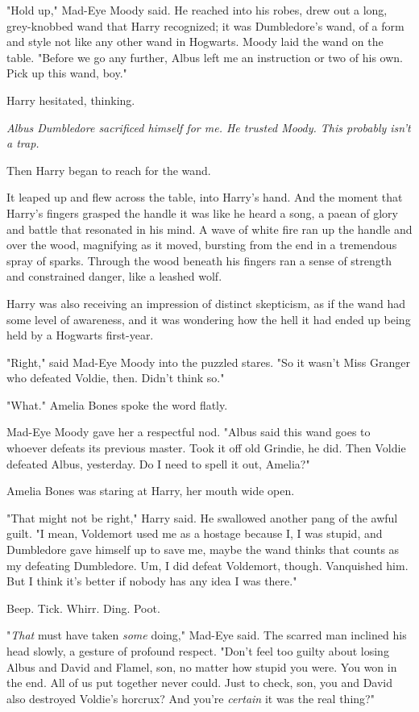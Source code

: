 "Hold up," Mad-Eye Moody said. He reached into his robes, drew out a long,
grey-knobbed wand that Harry recognized; it was Dumbledore's wand, of a form
and style not like any other wand in Hogwarts. Moody laid the wand on the
table. "Before we go any further, Albus left me an instruction or two of his
own. Pick up this wand, boy."

Harry hesitated, thinking.

\emph{Albus Dumbledore sacrificed himself for me. He trusted Moody. This
probably isn't a trap.}

Then Harry began to reach for the wand.

It leaped up and flew across the table, into Harry's hand. And the moment that
Harry's fingers grasped the handle it was like he heard a song, a paean of
glory and battle that resonated in his mind. A wave of white fire ran up the
handle and over the wood, magnifying as it moved, bursting from the end in a
tremendous spray of sparks. Through the wood beneath his fingers ran a sense of
strength and constrained danger, like a leashed wolf.

Harry was also receiving an impression of distinct skepticism, as if the wand
had some level of awareness, and it was wondering how the hell it had ended up
being held by a Hogwarts first-year.

"Right," said Mad-Eye Moody into the puzzled stares. "So it wasn't Miss Granger
who defeated Voldie, then. Didn't think so."

"What." Amelia Bones spoke the word flatly.

Mad-Eye Moody gave her a respectful nod. "Albus said this wand goes to whoever
defeats its previous master. Took it off old Grindie, he did. Then Voldie
defeated Albus, yesterday. Do I need to spell it out, Amelia?"

Amelia Bones was staring at Harry, her mouth wide open.

"That might not be right," Harry said. He swallowed another pang of the awful
guilt. "I mean, Voldemort used me as a hostage because I, I was stupid, and
Dumbledore gave himself up to save me, maybe the wand thinks that counts as my
defeating Dumbledore. Um, I did defeat Voldemort, though. Vanquished him. But I
think it's better if nobody has any idea I was there."

Beep. Tick. Whirr. Ding. Poot.

"\emph{That} must have taken \emph{some} doing," Mad-Eye said. The scarred man
inclined his head slowly, a gesture of profound respect. "Don't feel too guilty
about losing Albus and David and Flamel, son, no matter how stupid you were.
You won in the end. All of us put together never could. Just to check, son, you
and David also destroyed Voldie's horcrux? And you're \emph{certain} it was the
real thing?"

